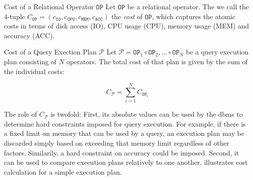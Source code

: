 \begin{definition}[label=definition:op_cost]{Cost of a Relational Operator $\mathtt{OP}$}{}
    Let $\mathtt{OP}$ be a relational operator. The we call the 4-tuple $C_{\mathtt{OP}} = (c_{\mathtt{IO}}, c_{\mathtt{CPU}}, c_{\mathtt{MEM}},c_{\mathtt{ACC}})$ the \emph{cost} of $\mathtt{OP}$, which captures the atomic costs in terms of disk access (IO), CPU usage (CPU), memory usage (MEM) and accuracy (ACC).
\end{definition}

\begin{definition}[label=definition:plan_cost]{Cost of a Query Exection Plan $\mathcal{P}$}{}
    Let $\mathcal{P} = \mathtt{OP}_1 \circ \mathtt{OP}_2, \ldots \circ \mathtt{OP}_N $ be a query execution plan consisting of $N$ operators. The total cost of that plan is given by the sum of the individual costs:

    \begin{equation*}
        C_{\mathcal{P}} = \sum_{i=1}^{N} C_{\mathtt{OP}_i}
    \end{equation*}
\end{definition}

The role of $C_{\mathcal{P}}$ is twofold: First, its absolute values can be used by the \acrshort{dbms} to determine hard constraints imposed for query execution. For example, if there is a fixed limit on memory that can be used by a query, an execution plan may be discarded simply based on exceeding that memory limit regardless of other factors. Similarily, a hard constraint on accuracy could be imposed. Second, it can be used to compare execution plans relatively to one another.  illustrates cost calculation for a simple execution plan.

